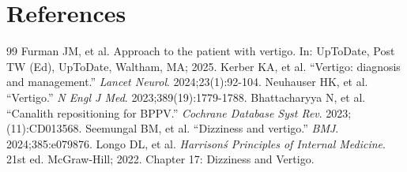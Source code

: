 \section*{References}
\begin{thebibliography}{99}
 Furman JM, et al. Approach to the patient with vertigo. In: UpToDate, Post TW (Ed), UpToDate, Waltham, MA; 2025.
 Kerber KA, et al. ``Vertigo: diagnosis and management.'' \emph{Lancet Neurol}. 2024;23(1):92-104.
 Neuhauser HK, et al. ``Vertigo.'' \emph{N Engl J Med}. 2023;389(19):1779-1788.
 Bhattacharyya N, et al. ``Canalith repositioning for BPPV.'' \emph{Cochrane Database Syst Rev}. 2023;(11):CD013568.
 Seemungal BM, et al. ``Dizziness and vertigo.'' \emph{BMJ}. 2024;385:e079876.
 Longo DL, et al. \emph{Harrison\'s Principles of Internal Medicine}. 21st ed. McGraw-Hill; 2022. Chapter 17: Dizziness and Vertigo.
\end{thebibliography}
